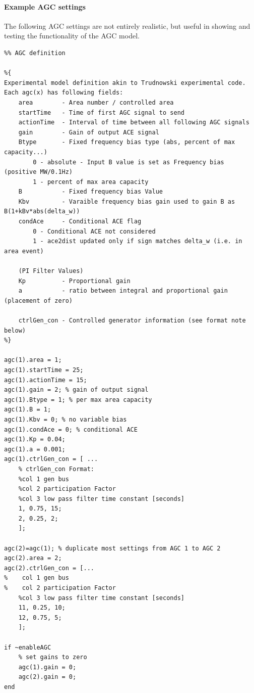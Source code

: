 \documentclass[12pt]{article}
\begin{document}
\pagebreak
\paragraph{Example AGC settings}
The following AGC settings are not entirely realistic, but useful in showing and testing the  functionality of the AGC model.

\begin{verbatim}
%% AGC definition

%{ 
Experimental model definition akin to Trudnowski experimental code.
Each agc(x) has following fields:
    area        - Area number / controlled area
    startTime   - Time of first AGC signal to send
    actionTime  - Interval of time between all following AGC signals
    gain        - Gain of output ACE signal
    Btype       - Fixed frequency bias type (abs, percent of max capacity...)
        0 - absolute - Input B value is set as Frequency bias (positive MW/0.1Hz)
        1 - percent of max area capacity
    B           - Fixed frequency bias Value
    Kbv         - Varaible frequency bias gain used to gain B as B(1+kBv*abs(delta_w))
    condAce     - Conditional ACE flag
        0 - Conditional ACE not considered
        1 - ace2dist updated only if sign matches delta_w (i.e. in area event)

    (PI Filter Values)
    Kp          - Proportional gain
    a           - ratio between integral and proportional gain (placement of zero)

    ctrlGen_con - Controlled generator information (see format note below)
%}

agc(1).area = 1;
agc(1).startTime = 25;
agc(1).actionTime = 15;
agc(1).gain = 2; % gain of output signal
agc(1).Btype = 1; % per max area capacity
agc(1).B = 1;
agc(1).Kbv = 0; % no variable bias
agc(1).condAce = 0; % conditional ACE
agc(1).Kp = 0.04;
agc(1).a = 0.001;
agc(1).ctrlGen_con = [ ...
    % ctrlGen_con Format:
    %col 1 gen bus
    %col 2 participation Factor
    %col 3 low pass filter time constant [seconds]
    1, 0.75, 15;
    2, 0.25, 2;
    ];

agc(2)=agc(1); % duplicate most settings from AGC 1 to AGC 2
agc(2).area = 2;
agc(2).ctrlGen_con = [...
%    col 1 gen bus
%    col 2 participation Factor
    %col 3 low pass filter time constant [seconds]
    11, 0.25, 10;
    12, 0.75, 5;
    ];

if ~enableAGC
    % set gains to zero
    agc(1).gain = 0;
    agc(2).gain = 0;
end

\end{verbatim}
\end{document}
